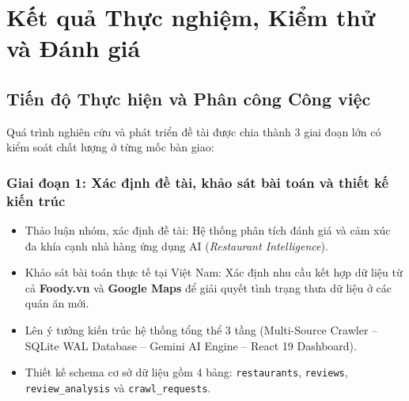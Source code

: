 \documentclass[12pt, a4paper]{article}
\begin{document}
\clearpage
\section{Kết quả Thực nghiệm, Kiểm thử và Đánh giá}

\subsection{Tiến độ Thực hiện và Phân công Công việc}

Quá trình nghiên cứu và phát triển đề tài được chia thành 3 giai đoạn lớn có kiểm soát chất lượng ở từng mốc bàn giao:

\subsubsection{Giai đoạn 1: Xác định đề tài, khảo sát bài toán và thiết kế kiến trúc}
\begin{itemize}[leftmargin=1.2cm]
    \item Thảo luận nhóm, xác định đề tài: Hệ thống phân tích đánh giá và cảm xúc đa khía cạnh nhà hàng ứng dụng AI (\textit{Restaurant Intelligence}).
    \item Khảo sát bài toán thực tế tại Việt Nam: Xác định nhu cầu kết hợp dữ liệu từ cả \textbf{Foody.vn} và \textbf{Google Maps} để giải quyết tình trạng thưa dữ liệu ở các quán ăn mới.
    \item Lên ý tưởng kiến trúc hệ thống tổng thể 3 tầng (Multi-Source Crawler -- SQLite WAL Database -- Gemini AI Engine -- React 19 Dashboard).
    \item Thiết kế schema cơ sở dữ liệu gồm 4 bảng: \texttt{restaurants}, \texttt{reviews}, \texttt{review\_analysis} và \texttt{crawl\_requests}.
\end{itemize}
\end{document}
